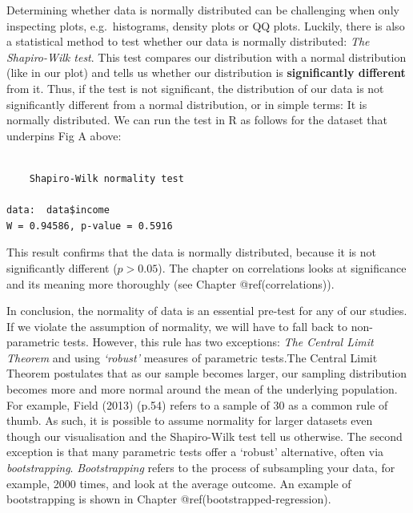 \documentclass[
  letterpaper,
]{krantz}
\makeatletter
\newenvironment{Shaded}{\begin{snugshade}}{\end{snugshade}}
\newcommand{\FunctionTok}[1]{\textcolor[rgb]{0.28,0.35,0.67}{#1}}
\newcommand{\NormalTok}[1]{\textcolor[rgb]{0.00,0.23,0.31}{#1}}
\newcommand{\SpecialCharTok}[1]{\textcolor[rgb]{0.37,0.37,0.37}{#1}}
\newenvironment{kframe}{%
\medskip{}
\setlength{\fboxsep}{.8em}
 \def\at@end@of@kframe{}%
 \ifinner\ifhmode%
  \def\at@end@of@kframe{\end{minipage}}%
  \begin{minipage}{\columnwidth}%
 \fi\fi%
 \def\FrameCommand##1{\hskip\@totalleftmargin \hskip-\fboxsep
 \colorbox{shadecolor}{##1}\hskip-\fboxsep
     \hskip-\linewidth \hskip-\@totalleftmargin \hskip\columnwidth}%
 \MakeFramed {\advance\hsize-\width
   \@totalleftmargin\z@ \linewidth\hsize
   \@setminipage}}%
 {\par\unskip\endMakeFramed%
 \at@end@of@kframe}
\renewenvironment{Shaded}{\begin{kframe}}{\end{kframe}}
\makeatother
\begin{document}
Determining whether data is normally distributed can be challenging when
only inspecting plots, e.g.~histograms, density plots or QQ plots.
Luckily, there is also a statistical method to test whether our data is
normally distributed: \emph{The Shapiro-Wilk test}. This test compares
our distribution with a normal distribution (like in our plot) and tells
us whether our distribution is \textbf{significantly different} from it.
Thus, if the test is not significant, the distribution of our data is
not significantly different from a normal distribution, or in simple
terms: It is normally distributed. We can run the test in R as follows
for the dataset that underpins Fig A above:

\begin{Shaded}
\end{Shaded}

\begin{verbatim}

    Shapiro-Wilk normality test

data:  data$income
W = 0.94586, p-value = 0.5916
\end{verbatim}

This result confirms that the data is normally distributed, because it
is not significantly different (\(p > 0.05\)). The chapter on
correlations looks at significance and its meaning more thoroughly (see
Chapter @ref(correlations)).

In conclusion, the normality of data is an essential pre-test for any of
our studies. If we violate the assumption of normality, we will have to
fall back to non-parametric tests. However, this rule has two
exceptions: \emph{The Central Limit Theorem} and using \emph{`robust'}
measures of parametric tests.The Central Limit Theorem postulates that
as our sample becomes larger, our sampling distribution becomes more and
more normal around the mean of the underlying population. For example,
Field (2013) (p.54) refers to a sample of 30 as a common rule of thumb.
As such, it is possible to assume normality for larger datasets even
though our visualisation and the Shapiro-Wilk test tell us otherwise.
The second exception is that many parametric tests offer a `robust'
alternative, often via \emph{bootstrapping}. \emph{Bootstrapping} refers
to the process of subsampling your data, for example, 2000 times, and
look at the average outcome. An example of bootstrapping is shown in
Chapter @ref(bootstrapped-regression).
\end{document}
